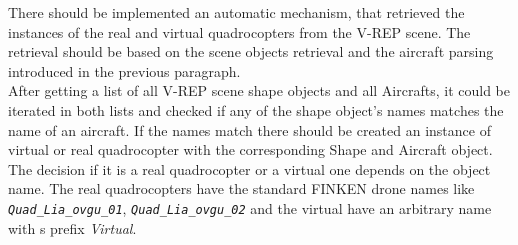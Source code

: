 There should be implemented an automatic mechanism, that retrieved the instances of the real and virtual quadrocopters from the V-REP scene. The retrieval should be based on the scene objects retrieval and the aircraft parsing introduced in the previous paragraph. \\
After getting a list of all V-REP scene shape objects and all Aircrafts, it could be iterated in both lists and checked if any of the shape object's names matches the name of an aircraft. If the names match there should be created an instance of virtual or real quadrocopter with the corresponding Shape and Aircraft object.
The decision if it is a real quadrocopter or a virtual one depends on the object name. The real quadrocopters have the standard FINKEN drone names like \textit{\texttt{Quad\_Lia\_ovgu\_01}}, \textit{\texttt{Quad\_Lia\_ovgu\_02}} and the virtual have an arbitrary name with s prefix \textit{Virtual}.

 

  

